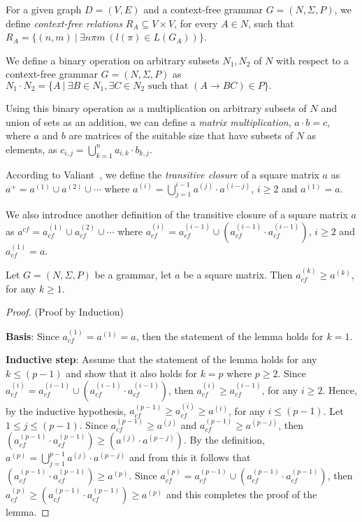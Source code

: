 For a given graph $D = (V, E)$ and a context-free grammar $G = (N, \Sigma, P)$, we define \textit{context-free relations} $R_A \subseteq V \times V$, for every $A \in N$, such that $R_A = \{(n,m)~|~\exists n \pi m~(l(\pi) \in L(G_A))\}$.

We define a binary operation on arbitrary subsets $N_1 , N_2$ of $N$ with respect to a context-free grammar $G = (N, \Sigma, P)$ as $N_1 \cdot N_2 = \{A~|~\exists B \in N_1, \exists C \in N_2 \text{ such that }(A \rightarrow B C) \in P\}.$

Using this binary operation as a multiplication on arbitrary subsets of $N$ and union of sets as an addition, we can define a \textit{matrix multiplication}, $a \cdot b = c$, where $a$ and $b$ are matrices of the suitable size that have subsets of $N$ as elements, as $c_{i,j} = \bigcup^{n}_{k=1}{a_{i,k} \cdot b_{k,j}}$.

According to Valiant~\cite{valiant}, we define the \textit{transitive closure} of a square matrix $a$ as $a^+ = a^{(1)} \cup a^{(2)} \cup \cdots$ where $a^{(i)} = \bigcup^{i-1}_{j=1}{a^{(j)} \cdot a^{(i-j)}}$, $i \ge 2$ and $a^{(1)} = a$.

We also introduce another definition of the transitive closure of a square matrix $a$ as $a^{cf} = a^{(1)}_{cf} \cup a^{(2)}_{cf} \cup \cdots$ where $a^{(i)}_{cf} = a^{(i-1)}_{cf} \cup (a^{(i-1)}_{cf} \cdot a^{(i-1)}_{cf})$, $i \ge 2$ and $a^{(1)}_{cf} = a$.

\begin{lemma}\label{lemma:cf_geq_valiant}
	Let $G =(N,\Sigma,P)$ be a grammar, let $a$ be a square matrix. Then $a^{(k)}_{cf} \geq a^{(k)}$, for any $k \geq 1$.
\end{lemma}
\begin{proof}(Proof by Induction)
	
	\textbf{Basis}: Since $a^{(1)}_{cf} = a^{(1)} = a$, then the statement of the lemma holds for $k = 1$.
	
	\textbf{Inductive step}: Assume that the statement of the lemma holds for any $k \leq (p - 1)$ and show that it also holds for $k = p$ where $p \geq 2$. Since $a^{(i)}_{cf} = a^{(i-1)}_{cf} \cup (a^{(i-1)}_{cf} \cdot a^{(i-1)}_{cf})$, then $a^{(i)}_{cf} \geq a^{(i-1)}_{cf}$, for any $i \geq 2$. Hence, by the inductive hypothesis, $a^{(p-1)}_{cf} \geq a^{(i)}_{cf} \geq a^{(i)}$, for any $i \leq (p-1)$. Let $1 \leq j \leq (p - 1)$. Since $a^{(p-1)}_{cf} \geq a^{(j)}$ and $a^{(p-1)}_{cf} \geq a^{(p-j)}$, then $(a^{(p-1)}_{cf} \cdot a^{(p-1)}_{cf}) \geq (a^{(j)} \cdot a^{(p-j)})$. By the definition, $a^{(p)} = \bigcup^{p-1}_{j=1}{a^{(j)} \cdot a^{(p-j)}}$ and from this it follows that $(a^{(p-1)}_{cf} \cdot a^{(p-1)}_{cf}) \geq a^{(p)}$. Since $a^{(p)}_{cf} = a^{(p-1)}_{cf} \cup (a^{(p-1)}_{cf} \cdot a^{(p-1)}_{cf})$, then $a^{(p)}_{cf} \geq (a^{(p-1)}_{cf} \cdot a^{(p-1)}_{cf}) \geq a^{(p)}$ and this completes the proof of the lemma.
\end{proof}

